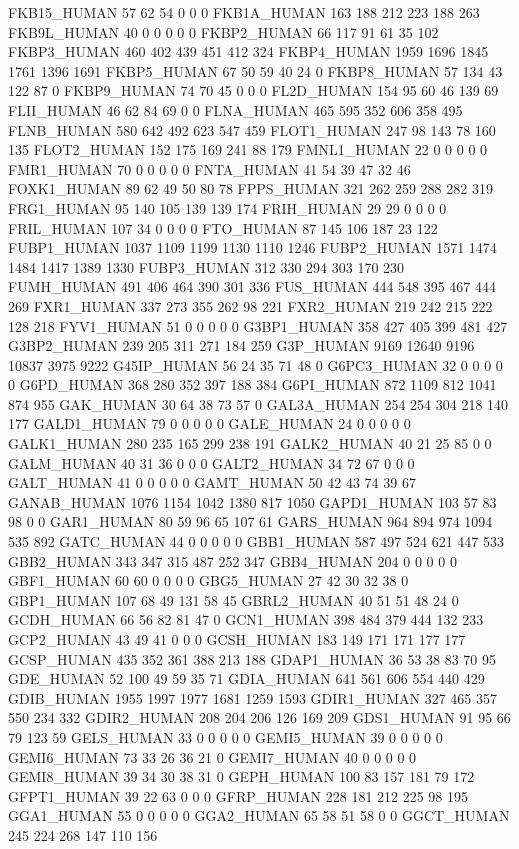 FKB15_HUMAN	57	62	54	0	0	0
FKB1A_HUMAN	163	188	212	223	188	263
FKB9L_HUMAN	40	0	0	0	0	0
FKBP2_HUMAN	66	117	91	61	35	102
FKBP3_HUMAN	460	402	439	451	412	324
FKBP4_HUMAN	1959	1696	1845	1761	1396	1691
FKBP5_HUMAN	67	50	59	40	24	0
FKBP8_HUMAN	57	134	43	122	87	0
FKBP9_HUMAN	74	70	45	0	0	0
FL2D_HUMAN	154	95	60	46	139	69
FLII_HUMAN	46	62	84	69	0	0
FLNA_HUMAN	465	595	352	606	358	495
FLNB_HUMAN	580	642	492	623	547	459
FLOT1_HUMAN	247	98	143	78	160	135
FLOT2_HUMAN	152	175	169	241	88	179
FMNL1_HUMAN	22	0	0	0	0	0
FMR1_HUMAN	70	0	0	0	0	0
FNTA_HUMAN	41	54	39	47	32	46
FOXK1_HUMAN	89	62	49	50	80	78
FPPS_HUMAN	321	262	259	288	282	319
FRG1_HUMAN	95	140	105	139	139	174
FRIH_HUMAN	29	29	0	0	0	0
FRIL_HUMAN	107	34	0	0	0	0
FTO_HUMAN	87	145	106	187	23	122
FUBP1_HUMAN	1037	1109	1199	1130	1110	1246
FUBP2_HUMAN	1571	1474	1484	1417	1389	1330
FUBP3_HUMAN	312	330	294	303	170	230
FUMH_HUMAN	491	406	464	390	301	336
FUS_HUMAN	444	548	395	467	444	269
FXR1_HUMAN	337	273	355	262	98	221
FXR2_HUMAN	219	242	215	222	128	218
FYV1_HUMAN	51	0	0	0	0	0
G3BP1_HUMAN	358	427	405	399	481	427
G3BP2_HUMAN	239	205	311	271	184	259
G3P_HUMAN	9169	12640	9196	10837	3975	9222
G45IP_HUMAN	56	24	35	71	48	0
G6PC3_HUMAN	32	0	0	0	0	0
G6PD_HUMAN	368	280	352	397	188	384
G6PI_HUMAN	872	1109	812	1041	874	955
GAK_HUMAN	30	64	38	73	57	0
GAL3A_HUMAN	254	254	304	218	140	177
GALD1_HUMAN	79	0	0	0	0	0
GALE_HUMAN	24	0	0	0	0	0
GALK1_HUMAN	280	235	165	299	238	191
GALK2_HUMAN	40	21	25	85	0	0
GALM_HUMAN	40	31	36	0	0	0
GALT2_HUMAN	34	72	67	0	0	0
GALT_HUMAN	41	0	0	0	0	0
GAMT_HUMAN	50	42	43	74	39	67
GANAB_HUMAN	1076	1154	1042	1380	817	1050
GAPD1_HUMAN	103	57	83	98	0	0
GAR1_HUMAN	80	59	96	65	107	61
GARS_HUMAN	964	894	974	1094	535	892
GATC_HUMAN	44	0	0	0	0	0
GBB1_HUMAN	587	497	524	621	447	533
GBB2_HUMAN	343	347	315	487	252	347
GBB4_HUMAN	204	0	0	0	0	0
GBF1_HUMAN	60	60	0	0	0	0
GBG5_HUMAN	27	42	30	32	38	0
GBP1_HUMAN	107	68	49	131	58	45
GBRL2_HUMAN	40	51	51	48	24	0
GCDH_HUMAN	66	56	82	81	47	0
GCN1_HUMAN	398	484	379	444	132	233
GCP2_HUMAN	43	49	41	0	0	0
GCSH_HUMAN	183	149	171	171	177	177
GCSP_HUMAN	435	352	361	388	213	188
GDAP1_HUMAN	36	53	38	83	70	95
GDE_HUMAN	52	100	49	59	35	71
GDIA_HUMAN	641	561	606	554	440	429
GDIB_HUMAN	1955	1997	1977	1681	1259	1593
GDIR1_HUMAN	327	465	357	550	234	332
GDIR2_HUMAN	208	204	206	126	169	209
GDS1_HUMAN	91	95	66	79	123	59
GELS_HUMAN	33	0	0	0	0	0
GEMI5_HUMAN	39	0	0	0	0	0
GEMI6_HUMAN	73	33	26	36	21	0
GEMI7_HUMAN	40	0	0	0	0	0
GEMI8_HUMAN	39	34	30	38	31	0
GEPH_HUMAN	100	83	157	181	79	172
GFPT1_HUMAN	39	22	63	0	0	0
GFRP_HUMAN	228	181	212	225	98	195
GGA1_HUMAN	55	0	0	0	0	0
GGA2_HUMAN	65	58	51	58	0	0
GGCT_HUMAN	245	224	268	147	110	156
